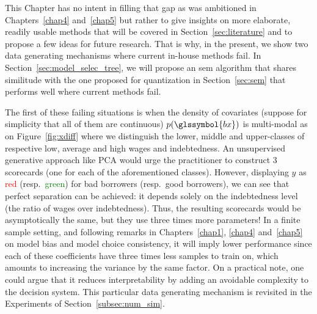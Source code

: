 This Chapter has no intent in filling that gap as was ambitioned in Chapters~\ref{chap4} and~\ref{chap5} but rather to give insights on more elaborate, readily usable methods that will be covered in Section~\ref{sec:literature} and to propose a few ideas for future research. That is why, in the present, we show two data generating mechanisms where current in-house methods fail. In Section~\ref{sec:model_selec_tree}, we will propose an \gls{sem} algorithm that shares similitude with the one proposed for quantization in Section~\ref{sec:sem} that performs well where current methods fail.

The first of these failing situations is when the density of covariates (suppose for simplicity that all of them are continuous) $p(\glssymbol{bx})$ is multi-modal as on Figure~\ref{fig:xdiff} where we distinguish the lower, middle and upper-classes of respective low, average and high wages and indebtedness. An unsupervised generative approach like PCA would urge the practitioner to construct 3 scorecards (one for each of the aforementioned classes). However, displaying $y$ as \textcolor{red}{red} (resp.\ \textcolor{green}{green}) for bad borrowers (resp.\ good borrowers), we can see that perfect separation can be achieved: it depends solely on the indebtedness level (the ratio of wages over indebtedness). Thus, the resulting scorecards would be asymptotically the same, but they use three times more parameters! In a finite sample setting, and following remarks in Chapters~\ref{chap1}, \ref{chap4} and~\ref{chap5} on model bias and model choice consistency, it will imply lower performance since each of these coefficients have three times less samples to train on, which amounts to increasing the variance by the same factor. On a practical note, one could argue that it reduces interpretability by adding an avoidable complexity to the decision system. This particular data generating mechanism is revisited in the Experiments of Section~\ref{subsec:num_sim}.


